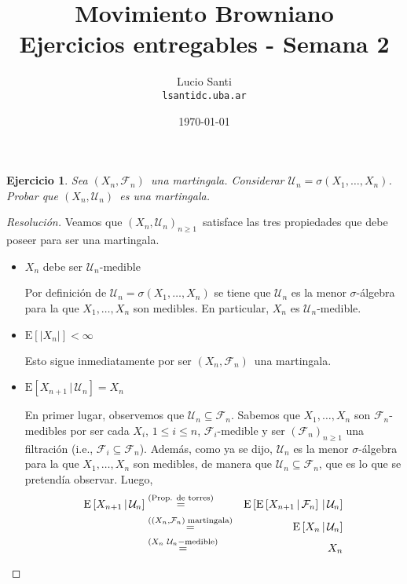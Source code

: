 \documentclass[a4paper,11pt]{article}
\title{Movimiento Browniano\\
      \small{Ejercicios entregables - Semana 2}}
\author{Lucio Santi\\
        \texttt{lsanti\at dc.uba.ar}}
\date{\today}
\newcommand{\abs}[1]{\ensuremath{\left\lvert #1 \right\rvert}}
\newcommand{\Sig}[1]{\ensuremath{\mathcal{#1}}}
\newcommand{\SigAlg}[1]{\ensuremath{\sigma\left(#1\right)}}
\newcommand{\Mart}[2]{\ensuremath{\left(#1_n, \Sig{#2}_n\right)}}
\newcommand{\Exp}[1]{\ensuremath{\textrm{E}\left[#1\right]}}
\newcommand{\ExpC}[2]{\ensuremath{\textrm{E}\left[#1 \, | \, #2\right]}}
\newtheorem*{ej}{Ejercicio}
\begin{document}
\maketitle

\begin{ej} 
    Sea \Mart{X}{F}~una martingala. Considerar $\Sig{U}_n = \SigAlg{X_1, \dots, X_n}$.
    Probar que \Mart{X}{U}~es una martingala.
\end{ej}

\begin{proof}[Resoluci\'on]
Veamos que $\Mart{X}{U}_{n \geq 1}$~satisface las tres propiedades que debe poseer
para ser una martingala. 

\begin{itemize}
    \item $X_n$ debe ser $\Sig{U}_n$-medible

    Por definición de $\Sig{U}_n = \SigAlg{X_1, \dots, X_n}$ se tiene que $\Sig{U}_n$
    es la menor $\sigma$-álgebra para la que $X_1,\dots,X_n$ son medibles. En
    particular, $X_n$ es $\Sig{U}_n$-medible.

    \item $\Exp{\abs{X_n}} < \infty$

    Esto sigue inmediatamente por ser \Mart{X}{F}~una martingala.

    \item $\ExpC{X_{n+1}}{\Sig{U}_n} = X_n$

    En primer lugar, observemos que $\Sig{U}_n \subseteq \Sig{F}_n$. Sabemos que
    $X_1,\dots,X_n$ son $\Sig{F}_n$-medibles por ser cada $X_i$, $1 \leq i \leq n$,
    $\Sig{F}_i$-medible y ser $(\Sig{F}_n)_{n \geq 1}$ una filtración (i.e.,
    $\Sig{F}_i \subseteq \Sig{F}_n$). Además, como ya se dijo, $\Sig{U}_n$ es la
    menor $\sigma$-álgebra para la que $X_1,\dots,X_n$ son medibles, de manera que
    $\Sig{U}_n \subseteq \Sig{F}_n$, que es lo que se pretendía observar. Luego,
    \begin{eqnarray*}
        \ExpC{X_{n+1}}{\Sig{U}_n} &\overset{\tiny{\textrm{(Prop. de torres)}}}{=}&
            \ExpC{ \ExpC{X_{n+1}}{\Sig{F}_n} }{\Sig{U}_n} \\
        &\overset{\tiny{(\Mart{X}{F}~\textrm{martingala})}}{=}&
            \ExpC{X_n}{\Sig{U}_n} \\
        &\overset{\tiny{(X_n \,\, \Sig{U}_n-\textrm{medible}})}{=}&
            X_n
    \end{eqnarray*}
\end{itemize}

\end{proof}
\end{document}
